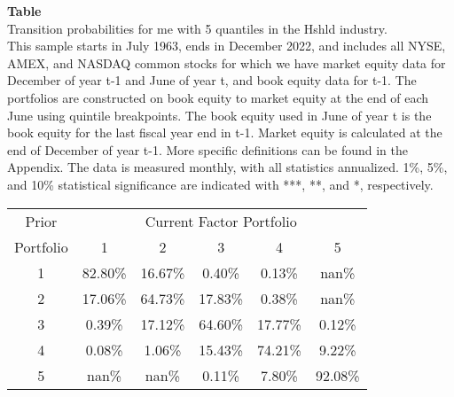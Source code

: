 \begin{table*}[ht!]
\raggedright
{}
\label{tab: transition_probs_me_Hshld_with_5_quantiles}
\textbf{Table \thetable} \\
Transition probabilities for me with 5 quantiles in the Hshld industry. \\
\hspace*{1em}This sample starts in July 1963, ends in December 2022, and includes all NYSE, AMEX, and NASDAQ common stocks for which we have market equity data for December of year t-1 and June of year t, and book equity data for t-1. The portfolios are constructed on book equity to market equity at the end of each June using quintile breakpoints.  The book equity used in June of year t is the book equity for the last fiscal year end in t-1.  Market equity is calculated at the end of December of year t-1.  More specific definitions can be found in the Appendix.  The data is measured monthly, with all statistics annualized.  1\%, 5\%, and 10\% statistical significance are indicated with ***, **, and *, respectively. \\
\vspace{0.5em}
\centering
\begin{adjustbox}{max width=\textwidth}
\begin{tabular}{@{}cccccc@{}}
\toprule
Prior & \multicolumn{5}{c}{Current Factor Portfolio} \\
Portfolio & 1 & 2 & 3 & 4 & 5 \\
\midrule
1 & 82.80\% & 16.67\% & 0.40\% & 0.13\% & nan\% \\
2 & 17.06\% & 64.73\% & 17.83\% & 0.38\% & nan\% \\
3 & 0.39\% & 17.12\% & 64.60\% & 17.77\% & 0.12\% \\
4 & 0.08\% & 1.06\% & 15.43\% & 74.21\% & 9.22\% \\
5 & nan\% & nan\% & 0.11\% & 7.80\% & 92.08\% \\
\bottomrule
\end{tabular}
\end{adjustbox}
\end{table*}